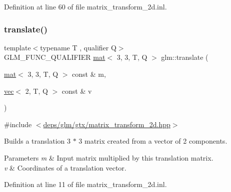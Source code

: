 Definition at line 60 of file matrix\+\_\+transform\+\_\+2d.\+inl.

\mbox{\label{group__gtx__matrix__transform__2d_gaa862e868893cf0b963e1d52e5dfb20c0}} 
\subsubsection{\texorpdfstring{translate()}{translate()}}
{\footnotesize\ttfamily template$<$typename T , qualifier Q$>$ \\
G\+L\+M\+\_\+\+F\+U\+N\+C\+\_\+\+Q\+U\+A\+L\+I\+F\+I\+ER \hyperlink{structglm_1_1mat}{mat}$<$ 3, 3, T, Q $>$ glm\+::translate (\begin{DoxyParamCaption}\item[{\hyperlink{structglm_1_1mat}{mat}$<$ 3, 3, T, Q $>$ const \&}]{m,  }\item[{\hyperlink{structglm_1_1vec}{vec}$<$ 2, T, Q $>$ const \&}]{v }\end{DoxyParamCaption})}



{\ttfamily \#include $<$\hyperlink{matrix__transform__2d_8hpp}{deps/glm/gtx/matrix\+\_\+transform\+\_\+2d.\+hpp}$>$}

Builds a translation 3 $\ast$ 3 matrix created from a vector of 2 components.


\begin{DoxyParams}{Parameters}
{\em m} & Input matrix multiplied by this translation matrix. \\
\hline
{\em v} & Coordinates of a translation vector. \\
\hline
\end{DoxyParams}


Definition at line 11 of file matrix\+\_\+transform\+\_\+2d.\+inl.

